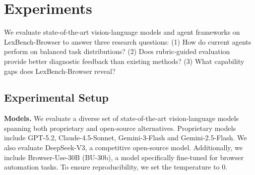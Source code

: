 \section{Experiments}
\label{sec:experiments}

We evaluate state-of-the-art vision-language models and agent frameworks on LexBench-Browser to answer three research questions: (1) How do current agents perform on balanced task distributions? (2) Does rubric-guided evaluation provide better diagnostic feedback than existing methods? (3) What capability gaps does LexBench-Browser reveal?

\subsection{Experimental Setup}




\noindent \textbf{Models.} We evaluate a diverse set of state-of-the-art vision-language models spanning both proprietary and open-source alternatives. Proprietary models include GPT-5.2, Claude-4.5-Sonnet, Gemini-3-Flash and Gemini-2.5-Flash. We also evaluate DeepSeek-V3, a competitive open-source model. Additionally, we include Browser-Use-30B (BU-30b), a model specifically fine-tuned for browser automation tasks. To ensure reproducibility, we set the temperature to 0.


